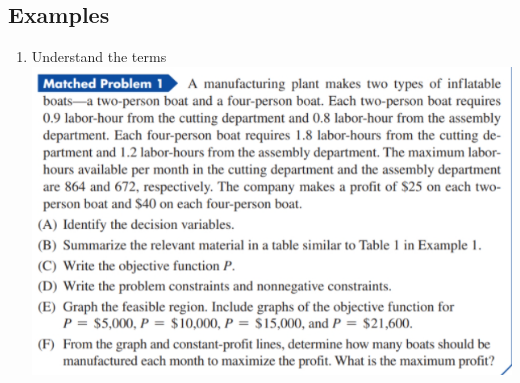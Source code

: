 \documentclass[14pt]{extarticle}
\begin{document}
\subsection{Examples}
\begin{enumerate}
	\item Understand the terms \\
\includegraphics[width=0.85\linewidth]{5-3_04}


\end{enumerate}
\end{document}
